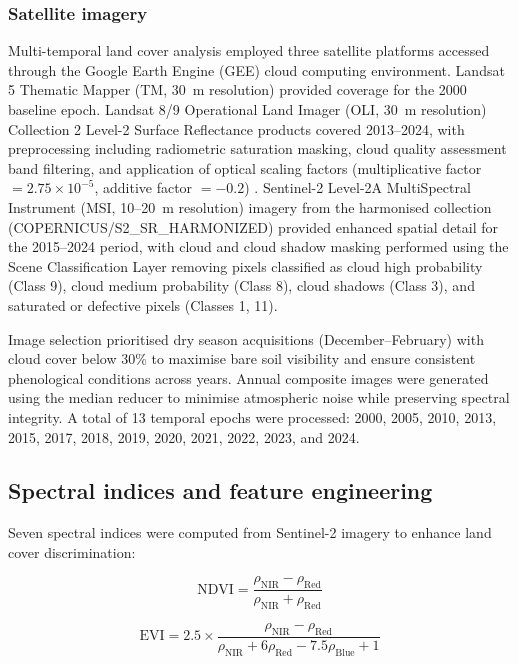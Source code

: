 \documentclass[preprint,12pt,authoryear]{elsarticle}
\begin{document}
\subsubsection{Satellite imagery}

Multi-temporal land cover analysis employed three satellite platforms accessed through the Google Earth Engine (GEE) cloud computing environment. Landsat 5 Thematic Mapper (TM, 30~m resolution) provided coverage for the 2000 baseline epoch. Landsat 8/9 Operational Land Imager (OLI, 30~m resolution) Collection 2 Level-2 Surface Reflectance products covered 2013--2024, with preprocessing including radiometric saturation masking, cloud quality assessment band filtering, and application of optical scaling factors (multiplicative factor $= 2.75 \times 10^{-5}$, additive factor $= -0.2$) \citep{USGS2024}. Sentinel-2 Level-2A MultiSpectral Instrument (MSI, 10--20~m resolution) imagery from the harmonised collection (COPERNICUS/S2\_SR\_HARMONIZED) provided enhanced spatial detail for the 2015--2024 period, with cloud and cloud shadow masking performed using the Scene Classification Layer removing pixels classified as cloud high probability (Class 9), cloud medium probability (Class 8), cloud shadows (Class 3), and saturated or defective pixels (Classes 1, 11).

Image selection prioritised dry season acquisitions (December--February) with cloud cover below 30\% to maximise bare soil visibility and ensure consistent phenological conditions across years. Annual composite images were generated using the median reducer to minimise atmospheric noise while preserving spectral integrity. A total of 13 temporal epochs were processed: 2000, 2005, 2010, 2013, 2015, 2017, 2018, 2019, 2020, 2021, 2022, 2023, and 2024.


\subsection{Spectral indices and feature engineering}

Seven spectral indices were computed from Sentinel-2 imagery to enhance land cover discrimination:

\begin{equation}
\text{NDVI} = \frac{\rho_\text{NIR} - \rho_\text{Red}}{\rho_\text{NIR} + \rho_\text{Red}}
\label{eq:ndvi}
\end{equation}

\begin{equation}
\text{EVI} = 2.5 \times \frac{\rho_\text{NIR} - \rho_\text{Red}}{\rho_\text{NIR} + 6\rho_\text{Red} - 7.5\rho_\text{Blue} + 1}
\label{eq:evi}
\end{equation}
\end{document}

